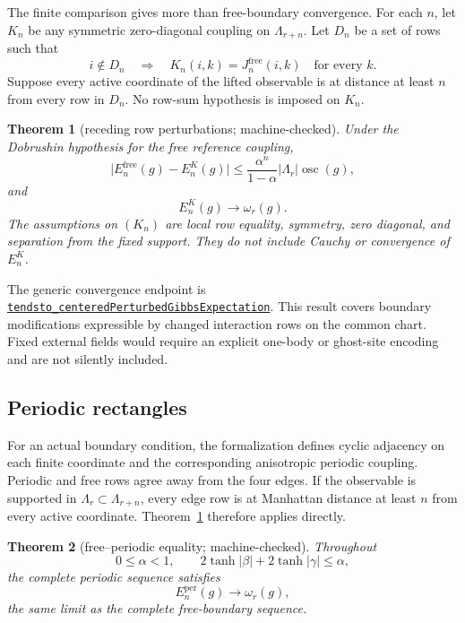 \documentclass[11pt]{article}
\newtheorem{theorem}{Theorem}[section]
\theoremstyle{definition}
\newcommand{\osc}{\operatorname{osc}}
\newcommand{\abs}[1]{\lvert #1\rvert}
\newcommand{\sourceanchor}{f587b35001f4ae87c7fe0383662864df6bc9a1c0}
\newcommand{\leanline}[3]{%
  \href{https://github.com/lluiseriksson/THE-ERIKSSON-PROGRAMME/blob/\sourceanchor/YangMills/OS/#1.lean\#L#2}{\nolinkurl{#3}}}
\begin{document}
The finite comparison gives more than free-boundary convergence.  For each
$n$, let $K_n$ be any symmetric zero-diagonal coupling on $\Lambda_{r+n}$.
Let $D_n$ be a set of rows such that
\[
  i\notin D_n\quad\Longrightarrow\quad
  K_n(i,k)=J_n^{\mathrm{free}}(i,k)\quad\text{for every }k.
\]
Suppose every active coordinate of the lifted observable is at distance at
least $n$ from every row in $D_n$.  No row-sum hypothesis is imposed on
$K_n$.

\begin{theorem}[receding row perturbations; machine-checked]
\label{thm:receding}
Under the Dobrushin hypothesis for the free reference coupling,
\[
  \abs{E_n^{\mathrm{free}}(g)-E_n^{K}(g)}
  \le
  \frac{\alpha^n}{1-\alpha}\abs{\Lambda_r}\osc(g),
\]
and
\[
  E_n^{K}(g)\longrightarrow\omega_r(g).
\]
The assumptions on $(K_n)$ are local row equality, symmetry, zero diagonal,
and separation from the fixed support.  They do not include Cauchy or
convergence of $E_n^K$.
\end{theorem}

The generic convergence endpoint is
\leanline{DobrushinInfiniteState}{328}{tendsto_centeredPerturbedGibbsExpectation}.
This result covers boundary modifications expressible by changed interaction
rows on the common chart.  Fixed external fields would require an explicit
one-body or ghost-site encoding and are not silently included.

\subsection{Periodic rectangles}

For an actual boundary condition, the formalization defines cyclic adjacency
on each finite coordinate and the corresponding anisotropic periodic coupling.
Periodic and free rows agree away from the four edges.  If the observable is
supported in $\Lambda_r\subset\Lambda_{r+n}$, every edge row is at Manhattan
distance at least $n$ from every active coordinate.  Theorem~\ref{thm:receding}
therefore applies directly.

\begin{theorem}[free--periodic equality; machine-checked]
\label{thm:periodic}
Throughout
\[
  0\le\alpha<1,
  \qquad
  2\tanh\abs\beta+2\tanh\abs\gamma\le\alpha,
\]
the complete periodic sequence satisfies
\[
  E_n^{\mathrm{per}}(g)\longrightarrow\omega_r(g),
\]
the same limit as the complete free-boundary sequence.
\end{theorem}
\end{document}
